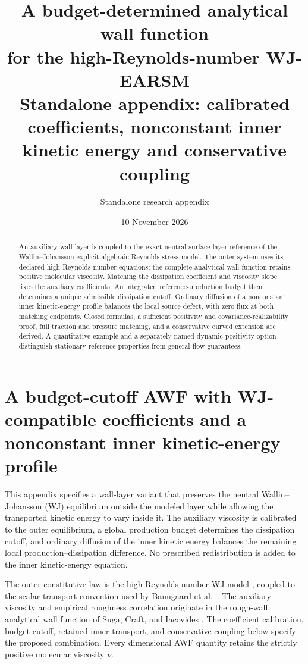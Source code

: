 \documentclass[11pt,a4paper]{article}
\title{\bfseries A budget-determined analytical wall function\\
for the high-Reynolds-number WJ-EARSM\\[4pt]
\large Standalone appendix: calibrated coefficients, nonconstant inner
kinetic energy and conservative coupling}
\author{Standalone research appendix}
\date{10 November 2026}
\numberwithin{equation}{section}
\begin{document}
\maketitle
\begin{abstract}
An auxiliary wall layer is coupled to the exact neutral surface-layer
reference of the Wallin--Johansson explicit algebraic Reynolds-stress
model. The outer system uses its declared high-Reynolds-number equations;
the complete analytical wall function retains positive molecular
viscosity. Matching the dissipation coefficient and viscosity slope fixes
the auxiliary coefficients. An integrated reference-production budget
then determines a unique admissible dissipation cutoff. Ordinary
diffusion of a nonconstant inner kinetic-energy profile balances the
local source defect, with zero flux at both matching endpoints.
Closed formulas, a sufficient positivity and covariance-realizability
proof, full traction and pressure matching, and a conservative curved
extension are derived. A quantitative example and a separately named
dynamic-positivity option distinguish stationary reference properties
from general-flow guarantees.
\end{abstract}
\clearpage
{\small\setlength{\parskip}{0pt}\tableofcontents}
\newpage
\appendix
\section{A budget-cutoff AWF with WJ-compatible coefficients and a nonconstant inner kinetic-energy profile}
\label{ba:section}

This appendix specifies a wall-layer variant that preserves the neutral
Wallin--Johansson (WJ) equilibrium outside the modeled layer while allowing
the transported kinetic energy to vary inside it. The auxiliary viscosity
is calibrated to the outer equilibrium, a global production budget determines
the dissipation cutoff, and ordinary diffusion of the inner kinetic energy
balances the remaining local production--dissipation difference. No prescribed
redistribution is added to the inner kinetic-energy equation.

The outer constitutive law is the high-Reynolds-number WJ model
\cite{WJ2000}, coupled to the scalar transport convention used by
Baungaard et al.\ \cite{Baungaard2022}. The auxiliary viscosity and empirical
roughness correlation originate in the rough-wall analytical wall function
of Suga, Craft, and Iacovides \cite{SCI2006}. The coefficient calibration,
budget cutoff, retained inner transport, and conservative coupling below
specify the proposed combination. Every dimensional AWF quantity retains
the strictly positive molecular viscosity $\nu$.
\end{document}
